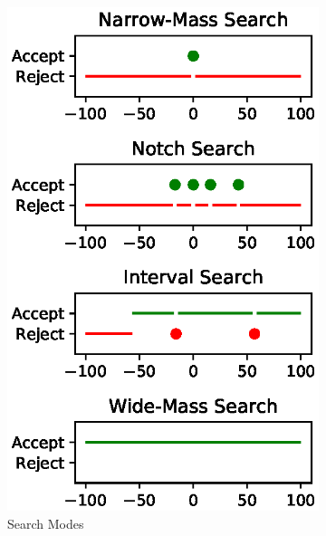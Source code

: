 \documentclass[journal=jprobs,manuscript=article]{achemso}
\begin{document}
\begin{figure}
\begin{subfigure}[b]{.5\linewidth}
  \includegraphics{figureDifferentSearchModes.eps}
  \caption{Search Modes}
  \label{fgr:differentSearchModes}
\end{subfigure}%
\begin{subfigure}[b]{.5\linewidth}

\end{subfigure}
\end{figure}
\end{document}
